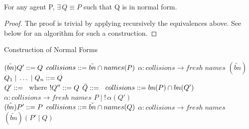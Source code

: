         \begin{lemma}{~\\}
            For any agent P, $\exists \, Q \equiv P$ such that Q is in normal form.
            \begin{proof}
                The proof is trivial by applying recursively the equivalences above.
                See below for an algorithm for such a construction.
            \end{proof}
        \end{lemma}

        \begin{breakablealgorithm}
            \caption{Construction of Normal Forms}
            \begin{algorithmic}[1]
                        \State$(\tilde{bn})Q' ::= Q$
                        \State$collisions ::= \tilde{bn} \cap names(P)$
                            \State$\alpha : collisions \rightarrow fresh\;names$
                            \State\Return{}
                        \Else
                            \State\Return$(\tilde{bn})$
                        \EndIf\\

                        \State$Q_1 \;|\; \ldots \;|\; Q_n ::= Q$
                        \State\Return{}\\

                        \State$Q' ::=$~ where $!Q'' ::= Q$
                            \State$\bar{Q} ::=$~
                            \State\Return{}
                        \Else
                            \State$collisions ::= bn(P) \cap bn(Q')$
                            \State$\alpha : collisions \rightarrow fresh\;names$
                            \State\Return$P \; | \; !\,\alpha(Q')$
                        \EndIf\\

                        \State$(\tilde{bn})P' ::= P$
                        \State$collisions ::= \tilde{bn} \cap names(Q)$
                            \State$\alpha : collisions \rightarrow fresh\;names$
                            \State\Return{}
                        \Else
                            \State\Return$(\tilde{bn})(P' \; | \; Q)$
                        \EndIf
                    \EndIf
                \EndFunction
            \end{algorithmic}
        \end{breakablealgorithm}
